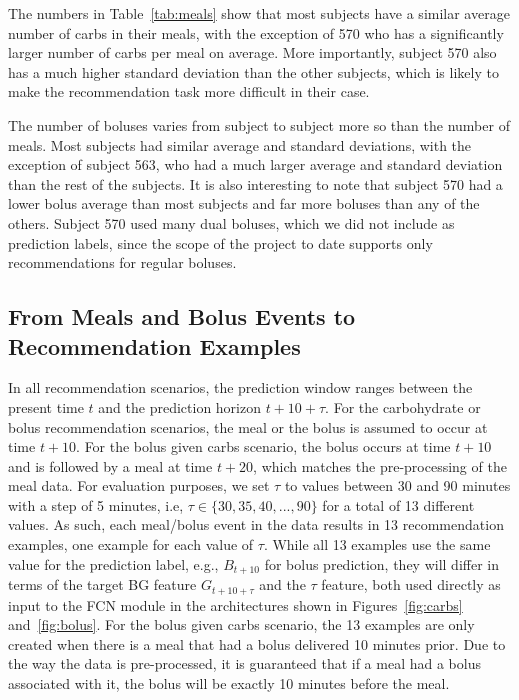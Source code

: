 \documentclass[graybox]{svmult}
\begin{document}
The numbers in Table~\ref{tab:meals} show that most subjects have a similar average number of carbs in their meals, with the exception of 570 who has a significantly larger number of carbs per meal on average. More importantly, subject 570 also has a much higher standard deviation than the other subjects, which is likely to make the recommendation task more difficult in their case.

The number of boluses varies from subject to subject more so than the number of meals. Most subjects had similar average and standard deviations, with the exception of subject 563, who had a much larger average and standard deviation than the rest of the subjects. It is also interesting to note that subject 570 had a lower bolus average than most subjects and far more boluses than any of the others. Subject 570 used many dual boluses, which we did not include as prediction labels, since the scope of the project to date supports only recommendations for regular boluses.


\subsection{From Meals and Bolus Events to Recommendation Examples}
\label{sec:examples}

In all recommendation scenarios, the prediction window ranges between the present time $t$ and the prediction horizon $t + 10 + \tau$. For the carbohydrate or bolus recommendation scenarios, the meal or the bolus is assumed to occur at time $t +10$. For the bolus given carbs scenario, the bolus occurs at time $t+10$ and is followed by a meal at time $t+20$, which matches the pre-processing of the meal data. For evaluation purposes, we set $\tau$ to values between 30 and 90 minutes with a step of 5 minutes, i.e, $\tau \in \{30, 35, 40, ..., 90\}$ for a total of 13 different values. As such, each meal/bolus event in the data results in 13 recommendation examples, one example for each value of $\tau$. While all 13 examples use the same value for the prediction label, e.g., $B_{t + 10}$ for bolus prediction, they will differ in terms of the target BG feature $G_{t + 10 + \tau}$ and the $\tau$ feature, both used directly as input to the FCN module in the architectures shown in Figures~\ref{fig:carbs} and~\ref{fig:bolus}. For the bolus given carbs scenario, the 13 examples are only created when there is a meal that had a bolus delivered 10 minutes prior. Due to the way the data is pre-processed, it is guaranteed that if a meal had a bolus associated with it, the bolus will be exactly 10 minutes before the meal. 
\end{document}
